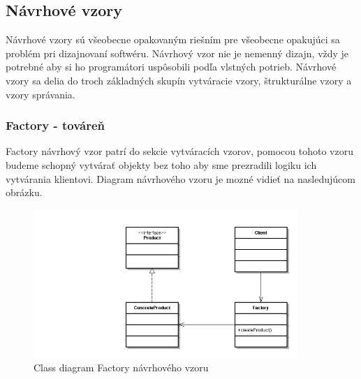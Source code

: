 \subsection{Návrhové vzory}
\indent Návrhové vzory sú všeobecne opakovaným riešním pre všeobecne opakujúci sa problém pri dizajnovaní softwéru. Návrhový vzor nie je nemenný dizajn, vždy je potrebné aby si ho programátori uspôsobili podľa vlstných potrieb. Návrhové vzory sa delia do troch základných skupín vytváracie vzory, štrukturálne vzory a vzory správania. \cite{designpattern}

\subsubsection{Factory - továreň}
\indent Factory návrhový vzor patrí do sekcie vytváracích vzorov, pomocou tohoto vzoru budeme schopný vytvárať objekty bez toho aby sme prezradili logiku ich vytvárania klientovi.\cite{designpattern}
Diagram návrhového vzoru je mozné vidieť na nasledujúcom obrázku.
\begin{figure}[!htbp]
	\centering
	\includegraphics[width=10cm]{img/factory_design_pattern.jpg}
	\caption{Class diagram Factory návrhového vzoru}
	\label{fig:test}
\end{figure}
\newline
